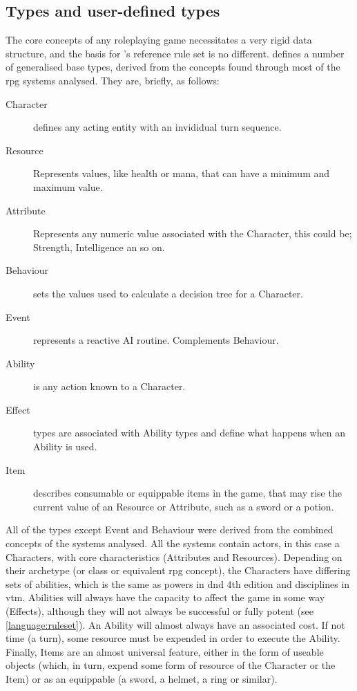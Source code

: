 \subsection{Types and user-defined types}
\label{language:types}
The core concepts of any roleplaying game necessitates a very rigid data structure, and the basis for \langname{}'s reference rule set is no different.
\langname{} defines a number of generalised base types, derived from the concepts found through most of the \ac{rpg} systems analysed. They are, briefly, as follows:
\begin{description}
	\item[Character] defines any acting entity with an invididual turn sequence.
	\item[Resource] Represents values, like health or mana, that can have a minimum and maximum value.
	\item[Attribute] Represents any numeric value associated with the Character, this could be; Strength, Intelligence an so on.
	\item[Behaviour] sets the values used to calculate a decision tree for a Character.
	\item[Event] represents a reactive AI routine. Complements Behaviour.
	\item[Ability] is any action known to a Character.
	\item[Effect] types are associated with Ability types and define what happens when an Ability is used.
	\item[Item] describes consumable or equippable items in the game, that may rise the current value of an Resource or Attribute, such as a sword or a potion.
\end{description} 

All of the types except Event and Behaviour were derived from the combined concepts of the systems analysed. All the systems contain actors, in this case a Characters, with core characteristics (Attributes and Resources). Depending on their archetype (or class or equivalent \ac{rpg} concept), the Characters have differing sets of abilities, which is the same as powers in \ac{dnd} 4th edition and disciplines in \ac{vtm}.
Abilities will always have the capacity to affect the game in some way (Effects), although they will not always be successful or fully potent (see \vref{language:ruleset}). An Ability will almost always have an associated cost. If not time (a turn), some resource must be expended in order to execute the Ability. Finally, Items are an almost universal feature, either in the form of useable objects (which, in turn, expend some form of resource of the Character or the Item) or as an equippable (a sword, a helmet, a ring or similar).

